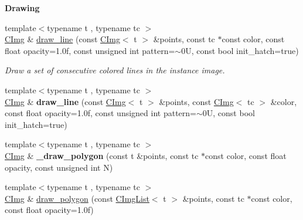 \begin{Indent}{\bf Drawing}
\begin{DoxyCompactItemize}
\item 
{\footnotesize template$<$typename t , typename tc $>$ }\\\hyperlink{structcimg__library_1_1_c_img}{C\-Img} \& \hyperlink{structcimg__library_1_1_c_img_acfab79f3f157cf8f9546d616758021a0}{draw\-\_\-line} (const \hyperlink{structcimg__library_1_1_c_img}{C\-Img}$<$ t $>$ \&points, const tc $\ast$const color, const float opacity=1.\-0f, const unsigned int pattern=$\sim$0\-U, const bool init\-\_\-hatch=true)
\begin{DoxyCompactList}\small\item\em Draw a set of consecutive colored lines in the instance image. \end{DoxyCompactList}\item 
\hypertarget{structcimg__library_1_1_c_img_af928319af23d8d6325e3615f1a9d6f7c}{{\footnotesize template$<$typename t , typename tc $>$ }\\\hyperlink{structcimg__library_1_1_c_img}{C\-Img} \& {\bfseries draw\-\_\-line} (const \hyperlink{structcimg__library_1_1_c_img}{C\-Img}$<$ t $>$ \&points, const \hyperlink{structcimg__library_1_1_c_img}{C\-Img}$<$ tc $>$ \&color, const float opacity=1.\-0f, const unsigned int pattern=$\sim$0\-U, const bool init\-\_\-hatch=true)}\label{structcimg__library_1_1_c_img_af928319af23d8d6325e3615f1a9d6f7c}

\item 
\hypertarget{structcimg__library_1_1_c_img_a01796d6cde83758c59b40e188e29ee80}{{\footnotesize template$<$typename t , typename tc $>$ }\\\hyperlink{structcimg__library_1_1_c_img}{C\-Img} \& {\bfseries \-\_\-draw\-\_\-polygon} (const t \&points, const tc $\ast$const color, const float opacity, const unsigned int N)}\label{structcimg__library_1_1_c_img_a01796d6cde83758c59b40e188e29ee80}

\item 
\hypertarget{structcimg__library_1_1_c_img_aa3ec0d2b16412bc259ca00f9b6740def}{{\footnotesize template$<$typename t , typename tc $>$ }\\\hyperlink{structcimg__library_1_1_c_img}{C\-Img} \& \hyperlink{structcimg__library_1_1_c_img_aa3ec0d2b16412bc259ca00f9b6740def}{draw\-\_\-polygon} (const \hyperlink{structcimg__library_1_1_c_img_list}{C\-Img\-List}$<$ t $>$ \&points, const tc $\ast$const color, const float opacity=1.\-0f)}\label{structcimg__library_1_1_c_img_aa3ec0d2b16412bc259ca00f9b6740def}


\end{DoxyCompactItemize}
\end{Indent}
